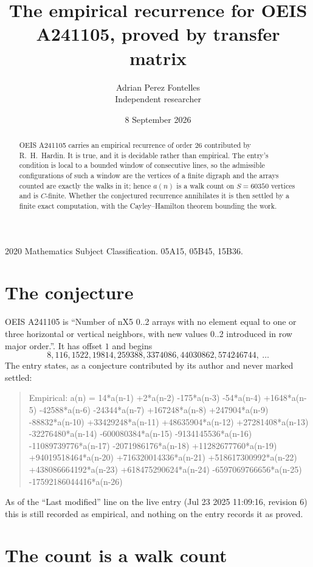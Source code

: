 \documentclass[11pt,a4paper]{article}
\title{The empirical recurrence for OEIS A241105, proved by transfer matrix}
\author{Adrian Perez Fontelles\\ \small Independent researcher}
\date{8 September 2026}
\theoremstyle{plain}
\theoremstyle{definition}
\begin{document}
\maketitle

\begin{abstract}
OEIS A241105 carries an empirical recurrence of order $26$ contributed by R.~H.~Hardin. It is
true, and it is decidable rather than empirical. The entry's condition is local to a bounded window of consecutive lines, so
the admissible configurations of such a window are the vertices of a finite digraph and the
arrays counted are exactly the walks in it; hence $a(n)$ is a walk count on $S=60350$ vertices
and is $C$-finite. Whether the conjectured recurrence annihilates it is then settled by a
finite exact computation, with the Cayley--Hamilton theorem bounding the work.
\end{abstract}

\noindent\small 2020 Mathematics Subject Classification. 05A15, 05B45, 15B36.\normalsize

\section{The conjecture}

OEIS A241105 is ``Number of nX5 0..2 arrays with no element equal to one or three horizontal or vertical neighbors, with new values 0..2 introduced in row major order.''. It has offset $1$ and begins
\[
8, 116, 1522, 19814, 259388, 3374086, 44030862, 574246744,\ \dots
\]
The entry states, as a conjecture contributed by its author and never marked settled:
\begin{quote}
Empirical: a(n) = 14*a(n-1) +2*a(n-2) -175*a(n-3) -54*a(n-4) +1648*a(n-5) -42588*a(n-6) -24344*a(n-7) +167248*a(n-8) +247904*a(n-9) -88832*a(n-10) +33429248*a(n-11) +48635904*a(n-12) +27281408*a(n-13) -32276480*a(n-14) -600080384*a(n-15) -9134145536*a(n-16) -11089739776*a(n-17) -2071986176*a(n-18) +11282677760*a(n-19) +94019518464*a(n-20) +716320014336*a(n-21) +518617300992*a(n-22) +438086664192*a(n-23) +618475290624*a(n-24) -6597069766656*a(n-25) -17592186044416*a(n-26)
\end{quote}
As of the ``Last modified'' line on the live entry (Jul 23 2025 11:09:16, revision 6) this is still
recorded as empirical, and nothing on the entry records it as proved.

\section{The count is a walk count}
\end{document}
